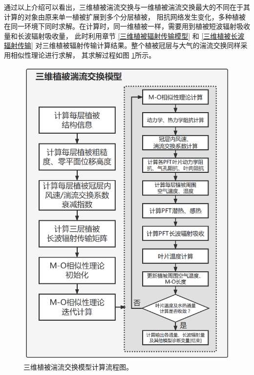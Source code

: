 通过以上介绍可以看出，三维植被湍流交换与一维植被湍流交换最大的不同在于其计算的对象由原来单一植被扩展到多个分层植被，
阻抗网络发生变化，多种植被在同一环境下同时求解。在计算时，同一维植被一样，需要用到植被短波辐射吸收量和长波辐射吸收量，
此时利用章节 \ref{三维植被辐射传输模型} 和 \ref{三维植被长波辐射传输} 对三维植被辐射传输计算结果。整个植被冠层与大气的湍流交换同样采用相似性理论进行求解，
其求解过程如图 \ref{fig:三维植被湍流交换模型计算流程图}所示。
{
\begin{figure}[]
\centering
\includegraphics{Figures/地表湍流交换过程/三维植被湍流交换模型计算流程图.png}
\caption{三维植被湍流交换模型计算流程图。}
\label{fig:三维植被湍流交换模型计算流程图}
\end{figure}
}




